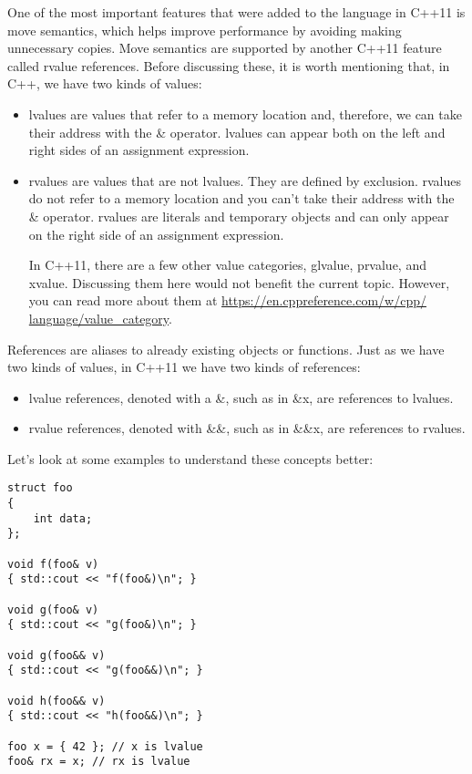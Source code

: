 One of the most important features that were added to the language in C++11 is move semantics, which helps improve performance by avoiding making unnecessary copies. Move semantics are supported by another C++11 feature called rvalue references. Before discussing these, it is worth mentioning that, in C++, we have two kinds of values:

\begin{itemize}
\item
lvalues are values that refer to a memory location and, therefore, we can take their address with the \& operator. lvalues can appear both on the left and right sides of an assignment expression.

\item
rvalues are values that are not lvalues. They are defined by exclusion. rvalues do not refer to a memory location and you can’t take their address with the \& operator. rvalues are literals and temporary objects and can only appear on the right side of an assignment expression.

\begin{tcolorbox}[breakable,enhanced jigsaw,colback=blue!5!white,colframe=blue!75!black,title={Note}]
In C++11, there are a few other value categories, glvalue, prvalue, and xvalue. Discussing them here would not benefit the current topic. However, you can read more about them at \url{https://en.cppreference.com/w/cpp/ language/value_category}.
\end{tcolorbox}

\end{itemize}

References are aliases to already existing objects or functions. Just as we have two kinds of values, in C++11 we have two kinds of references:

\begin{itemize}
\item
lvalue references, denoted with a \&, such as in \&x, are references to lvalues.

\item
rvalue references, denoted with \&\&, such as in \&\&x, are references to rvalues.
\end{itemize}

Let’s look at some examples to understand these concepts better:

\begin{lstlisting}[style=styleCXX]
struct foo
{
	int data;
};

void f(foo& v)
{ std::cout << "f(foo&)\n"; }

void g(foo& v)
{ std::cout << "g(foo&)\n"; }

void g(foo&& v)
{ std::cout << "g(foo&&)\n"; }

void h(foo&& v)
{ std::cout << "h(foo&&)\n"; }

foo x = { 42 }; // x is lvalue
foo& rx = x; // rx is lvalue
\end{lstlisting}

